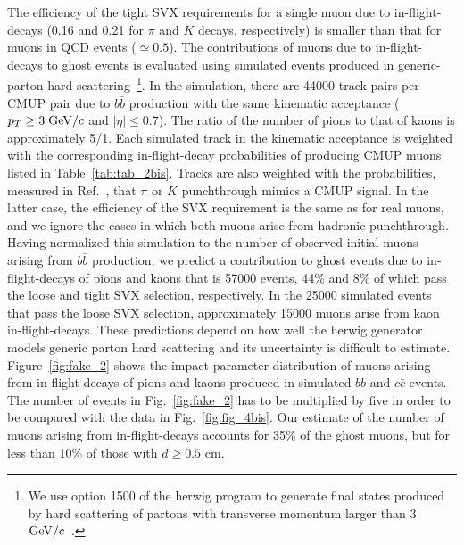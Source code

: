 \documentclass[aps,prd,preprint,floatfix,nofootinbib,superscriptaddress,showpacs,amssymb]{revtex4}
\begin{document}
 The efficiency of the tight SVX requirements for a single muon
 due to in-flight-decays
 (0.16 and 0.21 for $\pi$ and $K$ decays, respectively) is smaller
 than that for muons in QCD events  ($\simeq 0.5$). The contributions
 of muons due to in-flight-decays to ghost events is evaluated using 
 simulated events produced in   generic-parton hard scattering~\footnote{
 We use option 1500 of the {\sc herwig} program to generate final states
 produced by hard scattering of partons with transverse momentum larger
 than 3 ${\rm GeV/}c$~\cite{bbxs}.}.
 In the simulation, there are 44000 track pairs per CMUP pair due to
 $b\bar{b}$ production with the same kinematic acceptance ($p_T\geq 3\; {\rm GeV/}c$
 and $|\eta|\leq 0.7$). The ratio of the number of pions to that of  kaons
 is approximately 5/1. Each simulated track in the kinematic acceptance
 is weighted with the corresponding in-flight-decay probabilities 
 of producing CMUP muons listed in Table~\ref{tab:tab_2bis}. Tracks are  
 also weighted with the probabilities, measured in Ref.~\cite{bbxs},
 that $\pi$ or $K$ punchthrough mimics a CMUP signal. In the latter case,
 the efficiency of the SVX requirement is the same as for real muons, and
 we ignore the cases in which both muons arise from hadronic punchthrough.
 Having normalized this simulation to the number of observed initial muons 
 arising from $b\bar{b}$ production, we predict a contribution to ghost
 events due to in-flight-decays of pions and kaons that is 57000 events, 
 44\% and 8\% of which pass the loose and tight SVX selection, respectively.
 In the 25000 simulated events that pass the loose SVX selection, 
 approximately 15000 muons arise from kaon in-flight-decays. These predictions
 depend on how well the {\sc herwig} generator models generic parton hard
 scattering and its uncertainty is difficult to estimate.
 Figure~\ref{fig:fake_2} shows the impact parameter distribution of muons 
 arising from in-flight-decays of pions and kaons produced in simulated
 $b\bar{b}$ and $c\bar{c}$ events. The number of events in 
 Fig.~\ref{fig:fake_2} has to be multiplied by five in order to
 be compared with the data in  Fig.~\ref{fig:fig_4bis}. Our estimate of the
 number of muons arising from in-flight-decays accounts for 35\% of the 
 ghost muons, but  for less than 10\% of those with $d \geq 0.5$ cm.
\end{document}
